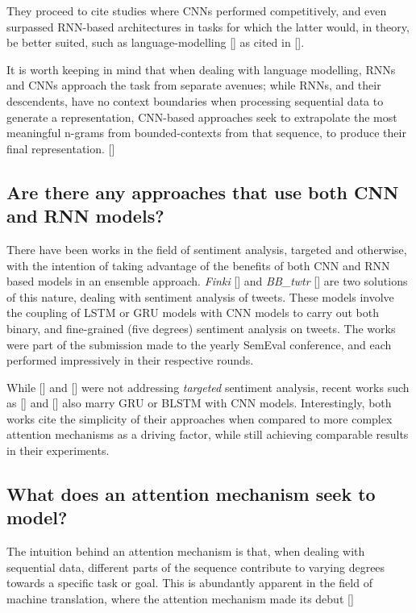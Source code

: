 \documentclass[12pt, a4paper]{report}
\theoremstyle{definition}
\theoremstyle{definition}%
\theoremstyle{definition}%
\theoremstyle{definition}%
\theoremstyle{definition}%
\theoremstyle{definition}%
\renewcommand{\cite}[1]{[\citealp{#1}]}
\begin{document}
They proceed to cite studies where CNNs performed competitively, and even surpassed RNN-based architectures in tasks for which the latter would, in theory, be better suited, such as language-modelling \cite{dauphin2017} as cited in \cite{young2017}.

It is worth keeping in mind that when dealing with language modelling, RNNs and CNNs approach the task from separate avenues; while RNNs, and their descendents, have no context boundaries when processing sequential data to generate a representation, CNN-based approaches seek to extrapolate the most meaningful n-grams from bounded-contexts from that sequence, to produce their final representation. \cite{young2017}

\subsection{Are there any approaches that use both CNN and RNN models?}
There have been works in the field of sentiment analysis, targeted and otherwise, with the intention of taking advantage of the benefits of both CNN and RNN based models in an ensemble approach. \textit{Finki} \cite{stojanovski2016} and \textit{BB\_twtr} \cite{cliche2017} are two solutions of this nature, dealing with sentiment analysis of tweets. These models involve the coupling of LSTM or GRU models with CNN models to carry out both binary, and fine-grained (five degrees) sentiment analysis on tweets. The works were part of the submission made to the yearly SemEval conference, and each performed impressively in their respective rounds.

While \cite{stojanovski2016} and \cite{cliche2017} were not addressing \textit{targeted} sentiment analysis, recent works such as \cite{xue2018} and \cite{xinli2018} also marry GRU or BLSTM with CNN models. Interestingly, both works cite the simplicity of their approaches when compared to more complex attention mechanisms as a driving factor, while still achieving comparable results in their experiments.

\subsection{What does an attention mechanism seek to model?}
The intuition behind an attention mechanism is that, when dealing with sequential data, different parts of the sequence contribute to varying degrees towards a specific task or goal. This is abundantly apparent in the field of machine translation, where the attention mechanism made its debut \cite{bahdanau2014}
\end{document}
